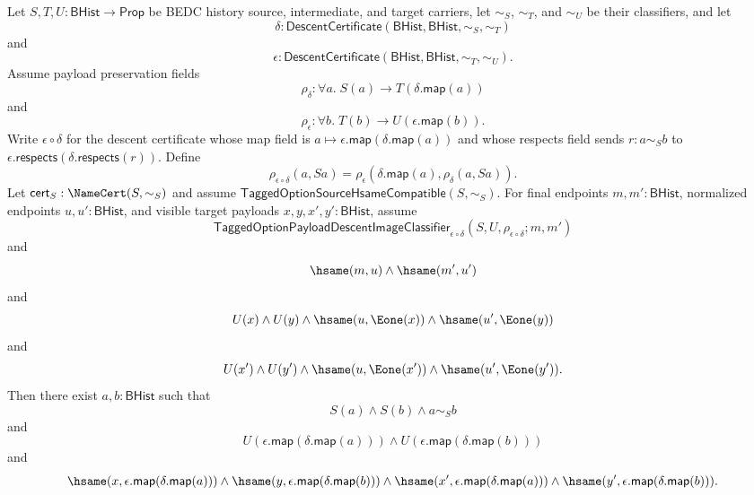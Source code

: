 \begin{theorem}
\label{thm:tagged-option-composite-image-classifier-normalized-visible-source-pair-coherence}
Let $S,T,U:\mathsf{BHist}\to\mathsf{Prop}$ be BEDC history source,
intermediate, and target carriers, let $\sim_S$, $\sim_T$, and $\sim_U$ be their
classifiers, and let
$$
\delta:\mathsf{DescentCertificate}(\mathsf{BHist},\mathsf{BHist},\sim_S,\sim_T)
$$
and
$$
\epsilon:\mathsf{DescentCertificate}(\mathsf{BHist},\mathsf{BHist},\sim_T,\sim_U).
$$
Assume payload preservation fields
$$
\rho_{\delta}:\forall a.\;S(a)\to T(\delta.\mathsf{map}(a))
$$
and
$$
\rho_{\epsilon}:\forall b.\;T(b)\to U(\epsilon.\mathsf{map}(b)).
$$
Write $\epsilon\circ\delta$ for the descent certificate whose map field is
$a\mapsto\epsilon.\mathsf{map}(\delta.\mathsf{map}(a))$ and whose respects field
sends $r:a\sim_S b$ to
$\epsilon.\mathsf{respects}(\delta.\mathsf{respects}(r))$. Define
$$
\rho_{\epsilon\circ\delta}(a,Sa)=
\rho_{\epsilon}(\delta.\mathsf{map}(a),\rho_{\delta}(a,Sa)).
$$
Let $\mathsf{cert}_S:\NameCert(S,\sim_S)$ and assume
$\mathsf{TaggedOptionSourceHsameCompatible}(S,\sim_S)$. For final endpoints
$m,m':\mathsf{BHist}$, normalized endpoints $u,u':\mathsf{BHist}$, and visible
target payloads $x,y,x',y':\mathsf{BHist}$, assume
$$
\mathsf{TaggedOptionPayloadDescentImageClassifier}_{\epsilon\circ\delta}
(S,U,\rho_{\epsilon\circ\delta};m,m')
$$
and
$$
\hsame(m,u)\land \hsame(m',u')
$$
and
$$
U(x)\land U(y)\land
\hsame(u,\Eone(x))\land \hsame(u',\Eone(y))
$$
and
$$
U(x')\land U(y')\land
\hsame(u,\Eone(x'))\land \hsame(u',\Eone(y')).
$$
Then there exist $a,b:\mathsf{BHist}$ such that
$$
S(a)\land S(b)\land a\sim_S b
$$
and
$$
U(\epsilon.\mathsf{map}(\delta.\mathsf{map}(a)))\land
U(\epsilon.\mathsf{map}(\delta.\mathsf{map}(b)))
$$
and
$$
\hsame(x,\epsilon.\mathsf{map}(\delta.\mathsf{map}(a)))\land
\hsame(y,\epsilon.\mathsf{map}(\delta.\mathsf{map}(b)))\land
\hsame(x',\epsilon.\mathsf{map}(\delta.\mathsf{map}(a)))\land
\hsame(y',\epsilon.\mathsf{map}(\delta.\mathsf{map}(b))).
$$
\end{theorem}
